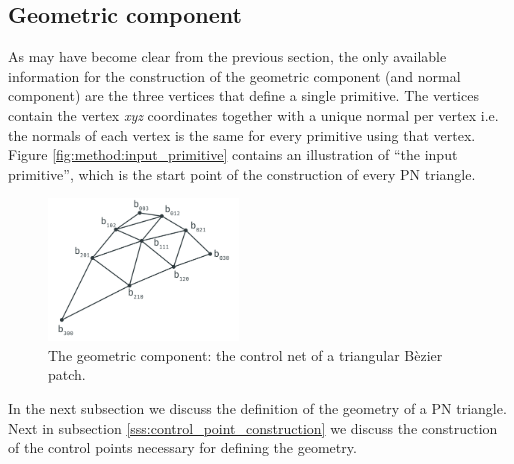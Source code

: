 
\subsection{Geometric component}
\label{ss:geometric_component}

As may have become clear from the previous section, the only available information for the construction of the geometric component (and normal component) are the three vertices that define a single primitive. The vertices contain the vertex \textit{xyz} coordinates together with a unique normal per vertex i.e. the normals of each vertex is the same for every primitive using that vertex. Figure \ref{fig:method:input_primitive} contains an illustration of ``the input primitive'', which is the start point of the construction of every PN triangle.

\begin{figure}
	\centering
	\includegraphics[width=0.45\textwidth]{./content/img/method/geometry.png}
	\caption{The geometric component: the control net of a triangular B\`ezier patch.}
	\label{fig:method:control_net}
\end{figure}
%
%
In the next subsection we discuss the definition of the geometry of a PN triangle. Next in subsection \ref{sss:control_point_construction} we discuss the construction of the control points necessary for defining the geometry. 

